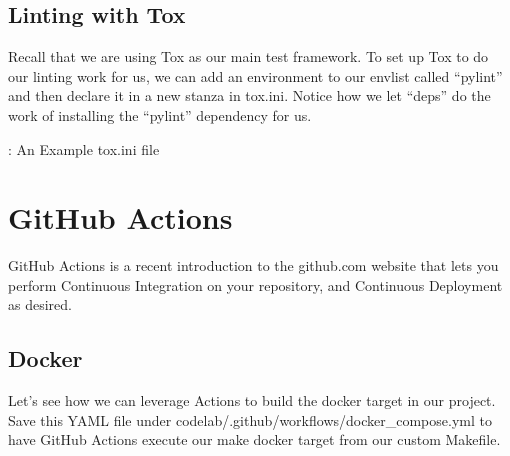 
\subsection{Linting with Tox}

Recall that we are using Tox as our main test framework. To set up Tox
to do our linting work for us, we can add an environment to our envlist
called ``pylint'' and then declare it in a new stanza in tox.ini. Notice
how we let ``deps'' do the work of installing the ``pylint'' dependency for
us.

\begin{mybox}{\thetcbcounter: An Example tox.ini file}
	
\end{mybox}

\section{GitHub Actions}

\justify{}
GitHub Actions is a recent introduction to the github.com website that
lets you perform Continuous Integration on your repository, and Continuous
Deployment as desired.

\subsection{Docker}
\justify{}
Let's see how we can leverage Actions to build the docker target in our
project. Save this YAML file under
codelab/.github/workflows/docker\_compose.yml to have GitHub Actions
execute our make docker target from our custom Makefile.

